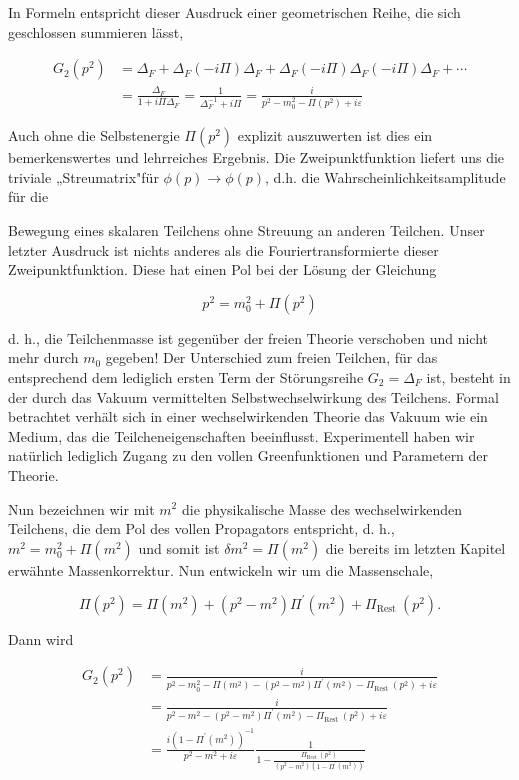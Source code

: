 \documentclass[10pt, letterpaper]{article}
\begin{document}
In Formeln entspricht dieser Ausdruck einer geometrischen Reihe, die sich geschlossen summieren lässt,

$$
\begin{aligned}
G_{2}\left(p^{2}\right) & =\Delta_{F}+\Delta_{F}(-i \Pi) \Delta_{F}+\Delta_{F}(-i \Pi) \Delta_{F}(-i \Pi) \Delta_{F}+\cdots \\
& =\frac{\Delta_{F}}{1+i \Pi \Delta_{F}}=\frac{1}{\Delta_{F}^{-1}+i \Pi}=\frac{i}{p^{2}-m_{0}^{2}-\Pi\left(p^{2}\right)+i \varepsilon}
\end{aligned}
$$

Auch ohne die Selbstenergie $\Pi\left(p^{2}\right)$ explizit auszuwerten ist dies ein bemerkenswertes und lehrreiches Ergebnis. Die Zweipunktfunktion liefert uns die triviale „Streumatrix"für $\phi(p) \longrightarrow \phi(p)$, d.h. die Wahrscheinlichkeitsamplitude für die

Bewegung eines skalaren Teilchens ohne Streuung an anderen Teilchen. Unser letzter Ausdruck ist nichts anderes als die Fouriertransformierte dieser Zweipunktfunktion. Diese hat einen Pol bei der Lösung der Gleichung

$$
p^{2}=m_{0}^{2}+\Pi\left(p^{2}\right)
$$

d. h., die Teilchenmasse ist gegenüber der freien Theorie verschoben und nicht mehr durch $m_{0}$ gegeben! Der Unterschied zum freien Teilchen, für das entsprechend dem lediglich ersten Term der Störungsreihe $G_{2}=\Delta_{F}$ ist, besteht in der durch das Vakuum vermittelten Selbstwechselwirkung des Teilchens. Formal betrachtet verhält sich in einer wechselwirkenden Theorie das Vakuum wie ein Medium, das die Teilcheneigenschaften beeinflusst. Experimentell haben wir natürlich lediglich Zugang zu den vollen Greenfunktionen und Parametern der Theorie.

Nun bezeichnen wir mit $m^{2}$ die physikalische Masse des wechselwirkenden Teilchens, die dem Pol des vollen Propagators entspricht, d. h., $m^{2}=m_{0}^{2}+\Pi\left(m^{2}\right)$ und somit ist $\delta m^{2}=\Pi\left(m^{2}\right)$ die bereits im letzten Kapitel erwähnte Massenkorrektur. Nun entwickeln wir um die Massenschale,

$$
\Pi\left(p^{2}\right)=\Pi\left(m^{2}\right)+\left(p^{2}-m^{2}\right) \Pi^{\prime}\left(m^{2}\right)+\Pi_{\text {Rest }}\left(p^{2}\right) .
$$

Dann wird

$$
\begin{aligned}
G_{2}\left(p^{2}\right) & =\frac{i}{p^{2}-m_{0}^{2}-\Pi\left(m^{2}\right)-\left(p^{2}-m^{2}\right) \Pi^{\prime}\left(m^{2}\right)-\Pi_{\text {Rest }}\left(p^{2}\right)+i \varepsilon} \\
& =\frac{i}{p^{2}-m^{2}-\left(p^{2}-m^{2}\right) \Pi^{\prime}\left(m^{2}\right)-\Pi_{\text {Rest }}\left(p^{2}\right)+i \varepsilon} \\
& =\frac{i\left(1-\Pi^{\prime}\left(m^{2}\right)\right)^{-1}}{p^{2}-m^{2}+i \varepsilon} \frac{1}{1-\frac{\Pi_{\text {Rest }}\left(p^{2}\right)}{\left(p^{2}-m^{2}\right)\left(1-\Pi^{\prime}\left(m^{2}\right)\right)}}
\end{aligned}
$$
\end{document}
